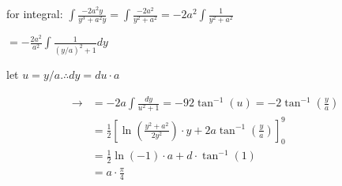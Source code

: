 \documentclass[12pt, a4paper]{article}
\begin{document}
for integral: $\int \frac{-2 a^{2} y}{y^{3}+a^{2} y}=\int \frac{-2 a^{2}}{y^{2}+a^{2}}=-2 a^{2} \int \frac{1}{y^{2}+a^{2}}$

$=-\frac{2 a^{2}}{a^{2}} \int \frac{1}{(y / a)^{2}+1} d y$

let $u=y / a . \therefore d y=d u \cdot a$

$$
\begin{aligned}
\rightarrow & =-2 a \int \frac{d y}{u^{2}+1}=-92 \tan ^{-1}(u)=-2 \tan ^{-1}\left(\frac{y}{a}\right) \\
& =\frac{1}{2}\left[\ln \left(\frac{y^{2}+a^{2}}{2 y^{2}}\right) \cdot y+2 a \tan ^{-1}\left(\frac{y}{a}\right)\right]_{0}^{9} \\
& =\frac{1}{2} \ln (-1) \cdot a+d \cdot \tan ^{-1}(1) \\
& =a \cdot \frac{\pi}{4}
\end{aligned}
$$
\end{document}
